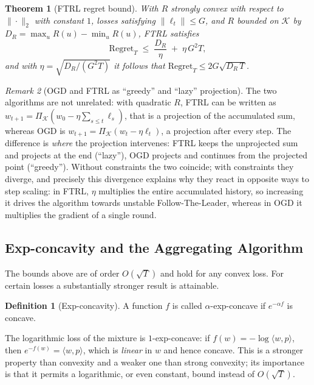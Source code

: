 \documentclass[12pt,a4paper,oneside]{report}
\renewcommand{\_}{\oldunderscore\allowbreak}
\theoremstyle{definition}
\newtheorem{definition}{Definition}[chapter]
\theoremstyle{plain}
\newtheorem{theorem}{Theorem}[chapter]
\theoremstyle{remark}
\newtheorem{remark}[theorem]{Remark}
\begin{document}
\begin{theorem}[FTRL regret bound]
\label{thm:ftrl}
With $R$ strongly convex with respect to $\|\cdot\|_2$ with constant $1$, losses satisfying
$\|\ell_t\|\leq G$, and $R$ bounded on $\mathcal{K}$ by $D_R = \max_u R(u) - \min_u R(u)$, FTRL
satisfies
\[
\mathrm{Regret}_T \;\leq\; \frac{D_R}{\eta} \;+\; \eta\, G^2 T,
\]
and with $\eta = \sqrt{D_R/(G^2T)}$ it follows that $\mathrm{Regret}_T \leq 2G\sqrt{D_R\, T}$.
\end{theorem}

\begin{remark}[OGD and FTRL as ``greedy'' and ``lazy'' projection]
The two algorithms are not unrelated: with quadratic $R$, FTRL can be written as
$w_{t+1} = \Pi_{\mathcal{K}}(w_0 - \eta\sum_{s\leq t}\ell_s)$, that is a projection of the
accumulated sum, whereas OGD is $w_{t+1} = \Pi_{\mathcal{K}}(w_t - \eta\ell_t)$, a projection
after every step. The difference is \emph{where} the projection intervenes: FTRL keeps the
unprojected sum and projects at the end (``lazy''), OGD projects and continues from the
projected point (``greedy''). Without constraints the two coincide; with constraints they
diverge, and precisely this divergence explains why they react in opposite ways to step
scaling: in FTRL, $\eta$ multiplies the entire accumulated history, so increasing it drives the
algorithm towards unstable Follow-The-Leader, whereas in OGD it multiplies the gradient of a
single round.
\end{remark}

\subsection{Exp-concavity and the Aggregating Algorithm}
\label{sec:expconcave}

The bounds above are of order $O(\sqrt{T})$ and hold for any convex loss. For certain losses a
substantially stronger result is attainable.

\begin{definition}[Exp-concavity]
A function $f$ is called $\alpha$-exp-concave if $e^{-\alpha f}$ is concave.
\end{definition}

The logarithmic loss of the mixture is $1$-exp-concave: if $f(w) = -\log \langle w, p\rangle$,
then $e^{-f(w)} = \langle w, p\rangle$, which is \emph{linear} in $w$ and hence concave. This
is a stronger property than convexity and a weaker one than strong convexity; its importance is
that it permits a logarithmic, or even constant, bound instead of $O(\sqrt{T})$.
\end{document}
